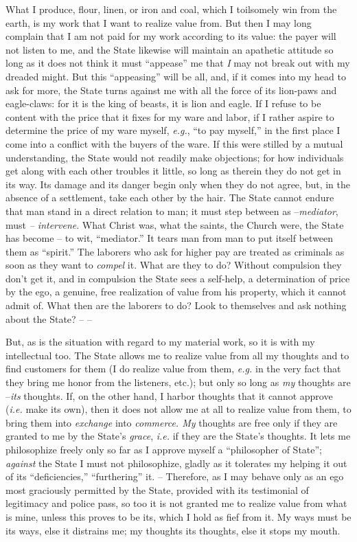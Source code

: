 What I produce, flour, linen, or iron and coal, which I toilsomely win from 
the earth, is my work that I want to realize value from. But then I may long 
complain that I am not paid for my work according to its value: the payer will 
not listen to me, and the State likewise will maintain an apathetic attitude 
so long as it does not think it must ``appease'' me that \textit{I} may not 
break out with my dreaded might. But this ``appeasing'' will be all, and, if 
it comes into my head to ask for more, the State turns against me with all the 
force of its lion-paws and eagle-claws: for it is the king of beasts, it is 
lion and eagle. If I refuse to be content with the price that it fixes for my 
ware and labor, if I rather aspire to determine the price of my ware myself, 
\textit{e.g.}, ``to pay myself,'' in the first place I come into a conflict 
with the buyers of the ware. If this were stilled by a mutual understanding, 
the State would not readily make objections; for how individuals get along 
with each other troubles it little, so long as therein they do not get in its 
way. Its damage and its danger begin only when they do not agree, but, in the 
absence of a settlement, take each other by the hair. The State cannot endure 
that man stand in a direct relation to man; it must step between as 
--\textit{mediator}, must \textit{-- intervene}. What Christ was, what the 
saints, the Church were, the State has become -- to wit, ``mediator.'' It 
tears man from man to put itself between them as ``spirit.'' The laborers 
who ask for higher pay are treated as criminals as soon as they want to 
\textit{compel} it. What are they to do? Without compulsion they don't get it, 
and in compulsion the State sees a self-help, a determination of price by the 
ego, a genuine, free realization of value from his property, which it cannot 
admit of. What then are the laborers to do? Look to themselves and ask nothing 
about the State? -- --

But, as is the situation with regard to my material work, so it is with my 
intellectual too. The State allows me to realize value from all my thoughts 
and to find customers for them (I do realize value from them, \textit{e.g.} 
in the very fact that they bring me honor from the listeners, etc.); but only 
so long as \textit{my} thoughts are --\textit{its} thoughts. If, on the other 
hand, I harbor thoughts that it cannot approve (\textit{i.e.} make its own), 
then it does not allow me at all to realize value from them, to bring them 
into \textit{exchange} into \textit{commerce. My} thoughts are free only if 
they are granted to me by the State's \textit{grace}, \textit{i.e.} if they 
are the State's thoughts. It lets me philosophize freely only so far as I 
approve myself a ``philosopher of State''; \textit{against} the State I must 
not philosophize, gladly as it tolerates my helping it out of its 
``deficiencies,'' ``furthering'' it. -- Therefore, as I may behave only as 
an ego most graciously permitted by the State, provided with its testimonial 
of legitimacy and police pass, so too it is not granted me to realize value 
from what is mine, unless this proves to be its, which I hold as fief from it. 
My ways must be its ways, else it distrains me; my thoughts its thoughts, else 
it stops my mouth.

